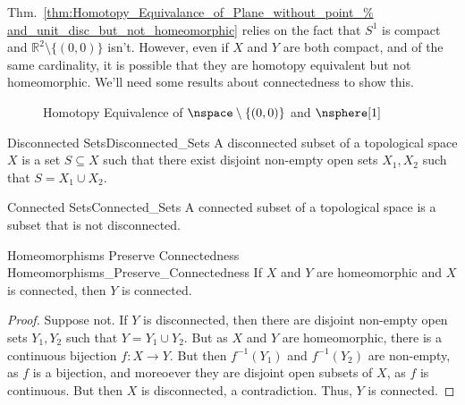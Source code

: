 \documentclass{article}                                                        %
\begin{document}
        Thm.~\ref{thm:Homotopy_Equivalance_of_Plane_without_point_%
                  and_unit_disc_but_not_homeomorphic}
        relies on the fact that $S^{1}$ is compact and
        $\mathbb{R}^{2}\setminus\{(0,0)\}$ isn't. However, even if $X$ and
        $Y$ are both compact, and of the same cardinality, it is possible
        that they are homotopy equivalent but not homeomorphic. We'll need
        some results about connectedness to show this.
        \begin{figure}[H]
            \captionsetup{type=figure}
            \centering
            
            \caption{Homotopy Equivalence of
                     $\nspace\setminus\{(0,0)\}$ and $\nsphere[1]$}
            \label{fig:homotopy_equivalence_between_the_plane_%
                   with_a_point_removed_and_the_unit_circle}
        \end{figure}
        \begin{ldefinition}{Disconnected Sets}{Disconnected_Sets}
            A disconnected subset of a topological space $X$ is a set
            $S\subseteq{X}$ such that there exist disjoint non-empty open
            sets $X_{1},X_{2}$ such that $S=X_{1}\cup{X_{2}}$.
        \end{ldefinition}
        \begin{ldefinition}{Connected Sets}{Connected_Sets}
            A connected subset of a topological space
            is a subset that is not disconnected.
        \end{ldefinition}
        \begin{ltheorem}{Homeomorphisms Preserve Connectedness}
                        {Homeomorphisms_Preserve_Connectedness}
            If $X$ and $Y$ are homeomorphic and
            $X$ is connected, then $Y$ is connected.
        \end{ltheorem}
        \begin{proof}
            Suppose not. If $Y$ is disconnected, then there are disjoint
            non-empty open sets $Y_{1},Y_{2}$ such that
            $Y=Y_{1}\cup{Y_{2}}$. But as $X$ and $Y$ are homeomorphic,
            there is a continuous bijection $f:X\rightarrow{Y}$. But then
            $f^{-1}(Y_{1})$ and $f^{-1}(Y_{2})$ are non-empty, as $f$ is a
            bijection, and moreoever they are disjoint open subsets of $X$,
            as $f$ is continuous. But then $X$ is disconnected,
            a contradiction. Thus, $Y$ is connected.
        \end{proof}
\end{document}
